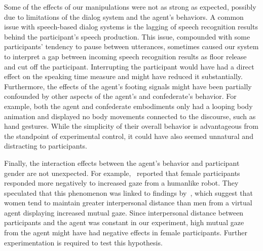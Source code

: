 Some of the effects of our manipulations were not as strong as expected, possibly due to limitations of the dialog system and the agent's behaviors. A common issue with speech-based dialog systems is the lagging of speech recognition results behind the participant's speech production. This issue, compounded with some participants' tendency to pause between utterances, sometimes caused our system to interpret a gap between incoming speech recognition results as floor release and cut off the participant. Interrupting the participant would have had a direct effect on the speaking time measure and might have reduced it substantially.
Furthermore, the effects of the agent's footing signals might have been partially confounded by other aspects of the agent's and confederate's behavior. For example, both the agent and confederate embodiments only had a looping body animation and displayed no body movements connected to the discourse, such as hand gestures. While the simplicity of their overall behavior is advantageous from the standpoint of experimental control, it could have also seemed unnatural and distracting to participants.

Finally, the interaction effects between the agent's behavior and participant gender are not unexpected. For example,~\citet{mutlu2006storytelling} reported that female participants responded more negatively to increased gaze from a humanlike robot. They speculated that this phenomenon was linked to findings by~\citet{bailenson2001equilibrium}, which suggest that women tend to maintain greater interpersonal distance than men from a virtual agent displaying increased mutual gaze. Since interpersonal distance between participants and the agent was constant in our experiment, high mutual gaze from the agent might have had negative effects in female participants. Further experimentation is required to test this hypothesis. 